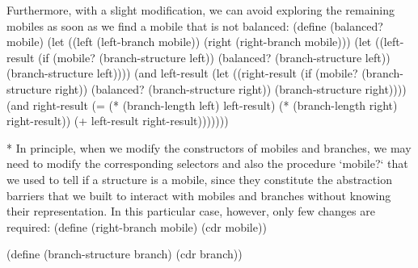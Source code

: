 Furthermore, with a slight modification, we can avoid exploring the remaining mobiles as soon as we find a mobile that is not balanced:
\begtt\scm
(define (balanced? mobile)
  (let ((left (left-branch mobile))
        (right (right-branch mobile)))
    (let ((left-result (if (mobile? (branch-structure left))
                           (balanced? (branch-structure left))
                           (branch-structure left))))
      (and left-result
           (let ((right-result (if (mobile? (branch-structure right))
                                   (balanced? (branch-structure right))
                                   (branch-structure right))))
              (and right-result
                   (= (* (branch-length left) left-result)
                      (* (branch-length right) right-result))
                   (+ left-result right-result)))))))
\endtt

* In principle, when we modify the constructors of mobiles and branches, we may need to modify the corresponding selectors and also the procedure `mobile?` that we used to tell if a structure is a mobile, since they constitute the abstraction barriers that we built to interact with mobiles and branches without knowing their representation. In this particular case, however, only few changes are required:
\begtt\scm
(define (right-branch mobile)
  (cdr mobile))

(define (branch-structure branch)
  (cdr branch))
\endtt
\enditems
